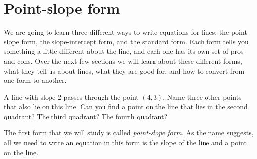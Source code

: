 \section{Point-slope form}
\label{pointslopeform}

We are going to learn three different ways to write equations for lines: the point-slope form, the slope-intercept form, and the standard form. Each form tells you something a little different about the line, and each one has its own set of pros and cons. Over the next few sections we will learn about these different forms, what they tell us about lines, what they are good for, and how to convert from one form to another.


\begin{boxexplore}
A line with slope 2 passes through the point $(4,3)$. Name three other points that also lie on this line. Can you find a point on the line that lies in the second quadrant? The third quadrant? The fourth quadrant?
\end{boxexplore} %

The first form that we will study is called \textit{point-slope form}. As the name suggests, all we need to write an equation in this form is the slope of the line and a point on the line.


